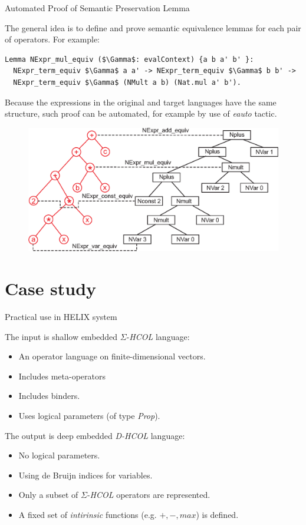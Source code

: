 \documentclass[aspectratio=169]{beamer}
\newcommand{\SHCOL}{\texorpdfstring{$\Sigma$-\emph{HCOL}}{Sigma-HCOL}}
\newcommand{\DHCOL}{\emph{D-HCOL}}
\begin{document}
\begin{frame}[fragile]{Automated Proof of Semantic Preservation Lemma}

  The general idea is to define and prove semantic
  equivalence lemmas for each pair of operators. For example:

  \begin{lstlisting}[language=Coq, mathescape=true,frame=single, basicstyle=\footnotesize]
Lemma NExpr_mul_equiv ($\Gamma$: evalContext) {a b a' b' }:
  NExpr_term_equiv $\Gamma$ a a' -> NExpr_term_equiv $\Gamma$ b b' ->
  NExpr_term_equiv $\Gamma$ (NMult a b) (Nat.mul a' b').
\end{lstlisting}

Because the expressions in the original and target languages have the
same structure, such proof can be automated, for example by use of
\emph{eauto} tactic.
  
  \begin{figure}[h]
    \includegraphics[width=0.5\columnwidth]{figures/trees.eps}
  \end{figure}

\end{frame}


\section{Case study}

\begin{frame}{Practical use in HELIX system}

  The input is shallow embedded {\SHCOL} language:
  \begin{itemize}
  \item An operator language on finite-dimensional vectors.
  \item Includes meta-operators
  \item Includes binders.
  \item Uses logical parameters (of type \emph{Prop}).
  \end{itemize}
  \medskip
  The output is deep embedded {\DHCOL} language:
  \begin{itemize}
  \item No logical parameters.
  \item Using de Bruijn indices for variables.
  \item Only a subset of {\SHCOL} operators are represented.
  \item A fixed set of \textit{intirinsic} functions (e.g. $+,-,max$) is defined.
  \end{itemize}
  
\end{frame}
\end{document}
